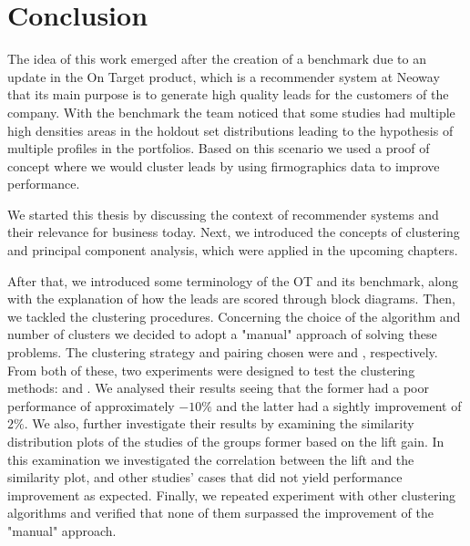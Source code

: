 \chapter{Conclusion} 
\label{cha:conclusion}

The idea of this work emerged after the creation of a benchmark due to an update in the On Target product, which is a recommender system at Neoway that its main purpose is to generate high quality leads for the customers of the company. With the benchmark the team noticed that some studies had multiple high densities areas in the holdout set distributions leading to the hypothesis of multiple profiles in the portfolios. Based on this scenario we used a proof of concept where we would cluster leads by using firmographics data to improve performance.

We started this thesis by discussing the context of recommender systems and their relevance for business today. Next, we introduced the concepts of clustering and principal component analysis, which were applied in the upcoming chapters.

After that, we introduced some terminology of the OT and its benchmark, along with the explanation of how the leads are scored through block diagrams. Then, we tackled the clustering procedures. Concerning the choice of the algorithm and number of clusters we decided to adopt a "manual" approach of solving these problems. The clustering strategy and pairing chosen were \nameClusterStrategyA{} and \nameClusterPairingA{}, respectively. From both of these, two experiments were designed to test the clustering methods: \nameExperimentI{} and \nameExperimentII{}.
We analysed their results seeing that the former had a poor performance of approximately $-10\%$ and the latter had a sightly improvement of $2\%$. We also, further investigate their results by examining the similarity distribution plots of the studies of the groups former based on the lift gain. In this examination we investigated the correlation between the lift and the similarity plot, and other studies' cases that did not yield performance improvement as expected. Finally, we repeated experiment \nameExperimentII{} with other clustering algorithms and verified that none of them surpassed the improvement of the "manual" approach.

